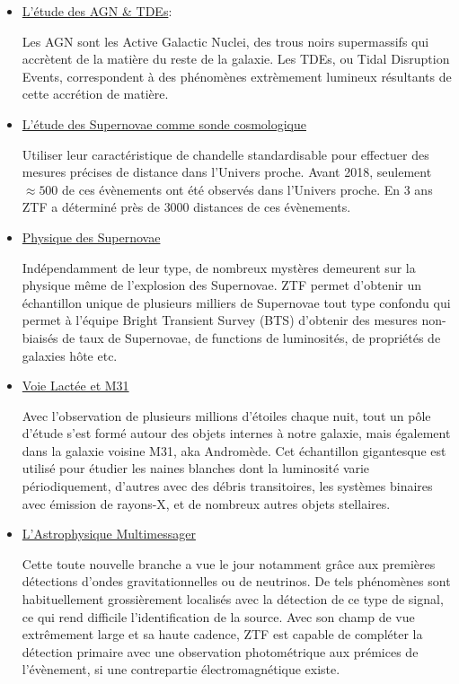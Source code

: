 \documentclass[../main/main.tex]{subfiles}
\begin{document}
\begin{itemize}[label=$\bullet$]
\setlength\itemsep{1em}
    \item \underline{L'étude des AGN \& TDEs}:
  
      Les AGN sont les Active Galactic Nuclei, des trous noirs
      supermassifs qui accrètent de la matière du reste de la
      galaxie. Les TDEs, ou Tidal Disruption Events, correspondent à des
      phénomènes extrèmement lumineux résultants de cette accrétion de
      matière.

    \item \underline{L'étude des Supernovae comme sonde cosmologique}
      
      Utiliser leur caractéristique de chandelle standardisable pour
      effectuer des mesures précises de distance dans l'Univers
      proche. Avant 2018, seulement $\approx500$ de ces évènements ont
      été observés dans l'Univers proche. En 3 ans ZTF a déterminé près
      de $3000$ distances de ces évènements.

    \item \underline{Physique des Supernovae}

      Indépendamment de leur type, de nombreux mystères demeurent sur la
      physique même de l'explosion des Supernovae. ZTF permet d'obtenir
      un échantillon unique de plusieurs milliers de Supernovae tout
      type confondu qui permet à l'équipe Bright Transient Survey
      (BTS) d'obtenir des mesures non-biaisés de taux de Supernovae, de functions de
      luminosités, de propriétés de galaxies hôte etc.

    \item \underline{Voie Lactée et M31}

      Avec l'observation de plusieurs millions d'étoiles chaque nuit, tout un
      pôle d'étude s'est formé autour des objets internes à notre
      galaxie, mais également dans la galaxie voisine M31, aka
      Andromède. Cet échantillon gigantesque est utilisé pour étudier
      les naines blanches dont la luminosité varie périodiquement,
      d'autres avec des débris transitoires, les systèmes binaires avec
      émission de rayons-X, et de nombreux autres objets stellaires.


    \item \underline{L'Astrophysique Multimessager}

      Cette toute nouvelle branche a vue le jour notamment grâce aux
      premières détections d'ondes gravitationnelles ou de neutrinos. De
      tels phénomènes sont habituellement grossièrement localisés avec
      la détection de ce type de signal, ce qui rend difficile
      l'identification de la source. Avec son champ de vue extrêmement
      large et sa haute cadence, ZTF est capable de compléter la
      détection primaire avec une observation photométrique aux prémices de
      l'évènement, si une contrepartie électromagnétique existe.


\end{itemize}
\end{document}
